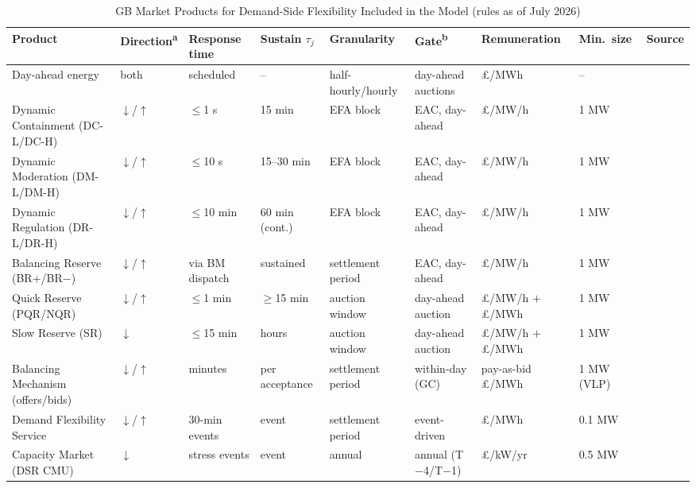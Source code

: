 \documentclass[lettersize,journal]{IEEEtran}
\begin{document}
\begin{table}[!t]
\centering
\caption{GB Market Products for Demand-Side Flexibility Included in the Model (rules as of July 2026)}
\label{tab:products}
\begin{scriptsize}
\setlength{\tabcolsep}{2.5pt}
\begin{tabular}{lllllllll}
\toprule
\textbf{Product} & \textbf{Direction\textsuperscript{a}} & \textbf{Response time} & \textbf{Sustain $\tau_j$} & \textbf{Granularity} & \textbf{Gate\textsuperscript{b}} & \textbf{Remuneration} & \textbf{Min.\ size} & \textbf{Source} \\
\midrule
Day-ahead energy & both & scheduled & -- & half-hourly/hourly & day-ahead auctions & \pounds/MWh & -- & \cite{elexon2026mhhs} \\
Dynamic Containment (DC-L/DC-H) & $\downarrow$/$\uparrow$ & $\leq$1 s & 15 min & EFA block & EAC, day-ahead & \pounds/MW/h & 1 MW & \cite{neso2026dynamic,ngeso2021dcterms} \\
Dynamic Moderation (DM-L/DM-H) & $\downarrow$/$\uparrow$ & $\leq$10 s & 15--30 min & EFA block & EAC, day-ahead & \pounds/MW/h & 1 MW & \cite{neso2026dynamic} \\
Dynamic Regulation (DR-L/DR-H) & $\downarrow$/$\uparrow$ & $\leq$10 min & 60 min (cont.) & EFA block & EAC, day-ahead & \pounds/MW/h & 1 MW & \cite{neso2026dynamic} \\
Balancing Reserve (BR$+$/BR$-$) & $\downarrow$/$\uparrow$ & via BM dispatch & sustained & settlement period & EAC, day-ahead & \pounds/MW/h & 1 MW & \cite{neso2026br} \\
Quick Reserve (PQR/NQR) & $\downarrow$/$\uparrow$ & $\leq$1 min & $\geq$15 min & auction window & day-ahead auction & \pounds/MW/h $+$ \pounds/MWh & 1 MW & \cite{neso2026qr,ofgem2024qr} \\
Slow Reserve (SR) & $\downarrow$ & $\leq$15 min & hours & auction window & day-ahead auction & \pounds/MW/h $+$ \pounds/MWh & 1 MW & \cite{neso2025srdesign} \\
Balancing Mechanism (offers/bids) & $\downarrow$/$\uparrow$ & minutes & per acceptance & settlement period & within-day (GC) & pay-as-bid \pounds/MWh & 1 MW (VLP) & \cite{elexon2024p415} \\
Demand Flexibility Service & $\downarrow$/$\uparrow$ & 30-min events & event & settlement period & event-driven & \pounds/MWh & 0.1 MW & \cite{neso2026dfs,neso2026dfsshakeup} \\
Capacity Market (DSR CMU) & $\downarrow$ & stress events & event & annual & annual (T$-$4/T$-$1) & \pounds/kW/yr & 0.5 MW & \cite{desnz2026cmparams} \\

\end{tabular}
\end{scriptsize}
\end{table}
\end{document}
